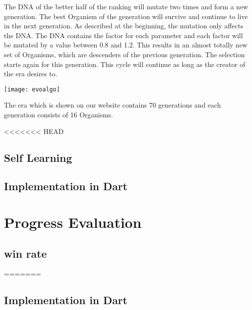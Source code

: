 The DNA of the better half of the ranking will mutate two times and form a new generation. The best Organism of the generation will survive and continue to live in the next generation.
As described at the beginning, the mutation only affects the DNA. The DNA contains the factor for each parameter and each factor will be mutated by a value between 0.8 and 1.2. This results in an almost totally new set of Organisms, which are descenders of the previous generation. The selection starts again for this generation.
This cycle will continue as long as the creator of the era desires to. \\

\begin{fixedpic}
	\centering
	\texttt{[image: evoalgo]}
\end{fixedpic}


The era which is shown on our website contains 70 generations and each generation consists of 16 Organisms.



<<<<<<< HEAD
\subsection{Self Learning}



\subsection{Implementation in Dart}


\section{Progress Evaluation}

\subsection{win rate}
=======
\subsection{Implementation in Dart}


